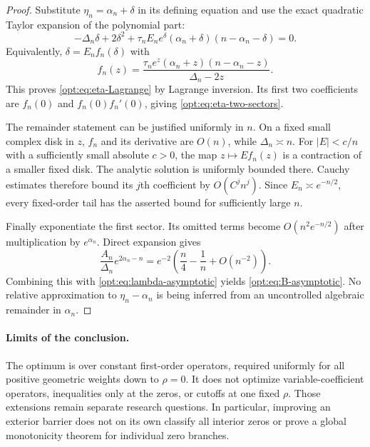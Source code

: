 \begin{proof}
Substitute $\eta_n=\alpha_n+\delta$ in its defining equation and use
the exact quadratic Taylor expansion of the polynomial part:
\[
 -\Delta_n\delta+2\delta^2+
 \tau_n E_ne^\delta(\alpha_n+\delta)(n-\alpha_n-\delta)=0.
\]
Equivalently, $\delta=E_nf_n(\delta)$ with
\[
 f_n(z)=
 \frac{\tau_ne^z(\alpha_n+z)(n-\alpha_n-z)}{\Delta_n-2z}.
\]
This proves \eqref{opt:eq:eta-Lagrange} by Lagrange inversion. Its
first two coefficients are $f_n(0)$ and $f_n(0)f_n'(0)$, giving
\eqref{opt:eq:eta-two-sectors}.

The remainder statement can be justified uniformly in $n$. On a fixed
small complex disk in $z$, $f_n$ and its derivative are $O(n)$, while
$\Delta_n\asymp n$. For $|E|<c/n$ with a sufficiently small absolute
$c>0$, the map $z\mapsto Ef_n(z)$ is a contraction of a smaller
fixed disk. The analytic solution is uniformly bounded there. Cauchy
estimates therefore bound its $j$th coefficient by $O(C^jn^j)$.
Since $E_n\asymp e^{-n/2}$, every fixed-order tail has the asserted
bound for sufficiently large $n$.

Finally exponentiate the first sector. Its omitted terms become
$O(n^2e^{-n/2})$ after multiplication by $e^{\alpha_n}$. Direct
expansion gives
\[
 \frac{A_n}{\Delta_n}e^{2\alpha_n-n}
 =e^{-2}\left(\frac n4-\frac1n+O(n^{-2})\right).
\]
Combining this with \eqref{opt:eq:lambda-asymptotic} yields
\eqref{opt:eq:B-asymptotic}. No relative approximation to
$\eta_n-\alpha_n$ is being inferred from an uncontrolled algebraic
remainder in $\alpha_n$.
\end{proof}

\paragraph{Limits of the conclusion.}
The optimum is over constant first-order operators, required uniformly
for all positive geometric weights down to $\rho=0$. It does not
optimize variable-coefficient operators, inequalities only at the zeros,
or cutoffs at one fixed $\rho$. Those extensions remain separate
research questions. In particular, improving an exterior barrier does
not on its own classify all interior zeros or prove a global
monotonicity theorem for individual zero branches.
